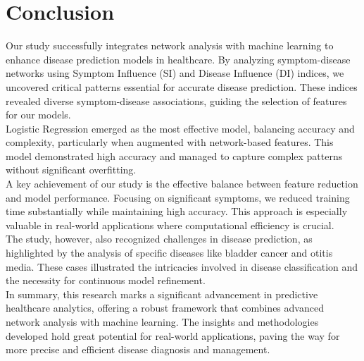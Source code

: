 \section{Conclusion}

Our study successfully integrates network analysis with machine learning to enhance disease prediction models in healthcare.
By analyzing symptom-disease networks using Symptom Influence (SI) and Disease Influence (DI) indices, we uncovered
critical patterns essential for accurate disease prediction. These indices revealed diverse symptom-disease associations,
guiding the selection of features for our models.\\
Logistic Regression emerged as the most effective model, balancing accuracy and complexity, particularly when augmented with network-based features.
This model demonstrated high accuracy and managed to capture complex patterns without significant overfitting.\\
A key achievement of our study is the effective balance between feature reduction and model performance.
Focusing on significant symptoms, we reduced training time substantially while maintaining high accuracy.
This approach is especially valuable in real-world applications where computational efficiency is crucial.\\
The study, however, also recognized challenges in disease prediction, as highlighted by the analysis of specific
diseases like bladder cancer and otitis media. These cases illustrated the intricacies involved in disease classification
and the necessity for continuous model refinement.\\
In summary, this research marks a significant advancement in predictive healthcare analytics, offering a robust framework
that combines advanced network analysis with machine learning. The insights and methodologies developed hold great potential
for real-world applications, paving the way for more precise and efficient disease diagnosis and management.